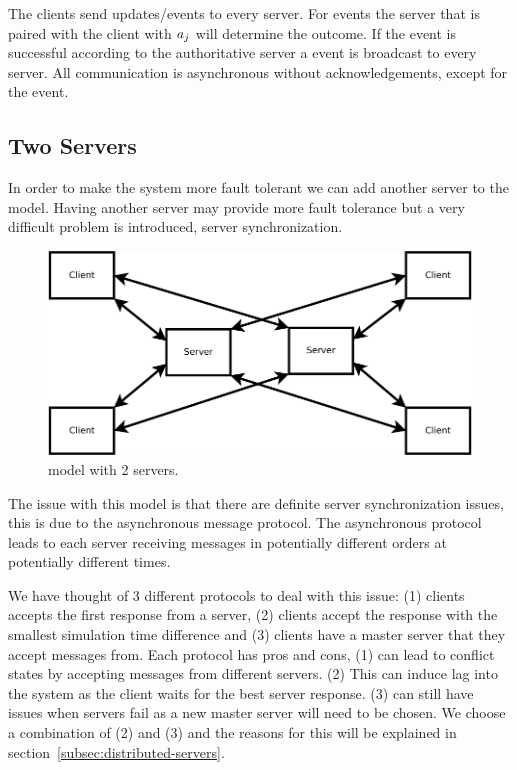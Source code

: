 	The clients send updates/events to every server. For  events the server that is paired with the client with $a_{j}$ will determine the outcome. If the  event is successful according to the authoritative server a  event is broadcast to every server. All communication is asynchronous without acknowledgements, except for the  event.

\subsection{Two Servers }

	In order to make the system more fault tolerant we can add another server to the \clientServer model. Having another server may provide more fault tolerance but a very difficult problem is introduced, server synchronization.
	
	\begin{figure}[ht]
		\includegraphics[width=0.95\linewidth]{../images/client-2server-model-crop.pdf}
		\caption{\label{figure:Client-2Server} \clientServer model with 2 servers.}
	\end{figure}
	
	The issue with this model is that there are definite server synchronization issues, this is due to the asynchronous message protocol. The asynchronous protocol leads to each server receiving messages in potentially different orders at potentially different times.
	
	We have thought of 3 different protocols to deal with this issue: (1) clients accepts the first response from a server, (2) clients accept the response with the smallest simulation time difference and (3) clients have a master server that they accept messages from. Each protocol has pros and cons, (1) can lead to conflict states by accepting messages from different servers. (2) This can induce lag into the system as the client waits for the best server response. (3) can still have issues when servers fail as a new master server will need to be chosen. We choose a combination of (2) and (3) and the reasons for this will be explained in section~\ref{subsec:distributed-servers}.
	
